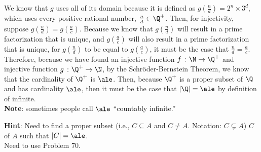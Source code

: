 {                \noindent We know that $g$ uses all of its domain because it is defined as $g(\frac{n}{d}) = 2^n \times 3^d$, which uses every positive rational number, $\frac{n}{d} \in \Q^+$. Then, for injectivity, suppose $g(\frac{n}{d}) = g(\frac{a}{c})$. Because we know that $g(\frac{n}{d})$ will result in a prime factorization that is unique, and $g(\frac{a}{c})$ will also result in a prime factorization that is unique, for $g(\frac{n}{d})$ to be equal to $g(\frac{a}{c})$, it must be the case that $\frac{n}{d} = \frac{a}{c}$. \\

                \noindent Therefore, because we have found an injective function $f \ \colon \N \rightarrow \Q^+$ and injective function $g \ \colon \Q^+ \rightarrow \N$, by the Schröder-Bernstein Theorem, we know that the cardinality of $\Q^+$ is $\ale$. Then, because $\Q^+$ is a proper subset of $\Q$ and has cardinality $\ale$, then it must be the case that $|\Q| = \ale$ by definition of infinite. 
            } \\
            
            \textbf{Note}: sometimes people call $\ale$ ``countably infinite.'' \\





            \textbf{Hint}: Need to find a proper subset (i.e., $C \subseteq A$ and $C \ne A$. Notation: $C \subsetneq A$) $C$ of $A$ such that $|C| = \ale$. \\
            Need to use Problem 70.

